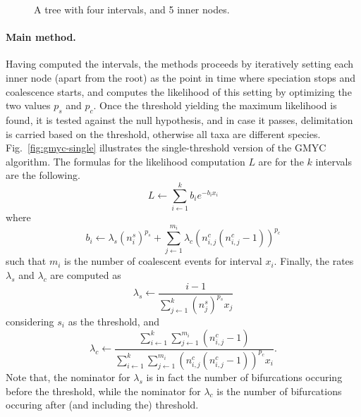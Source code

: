 \documentclass{llncs}
\begin{document}
\begin{figure}[t]
\centering

\caption{A tree with four intervals, and 5 inner nodes.}\label{fig:tree}
\end{figure}

\paragraph{\bf Main method.}
Having computed the intervals, the methods proceeds by iteratively setting each
inner node (apart from the root) as the point in time where speciation stops
and coalescence starts, and computes the likelihood of this setting by
optimizing the two values $p_s$ and $p_c$. Once the threshold yielding the
maximum likelihood is found, it is tested against the null hypothesis, and in
case it passes, delimitation is carried based on the threshold, otherwise all
taxa are different species. Fig.~\ref{fig:gmyc-single} illustrates the
single-threshold version of the GMYC algorithm.  The formulas for the
likelihood computation $L$ are for the $k$ intervals are the following.
$$L \leftarrow \sum_{i\leftarrow 1}^k b_i e^{-b_i x_i}$$
where
$$b_i \leftarrow \lambda_s (n_i^s)^{p_s} + \sum_{j\leftarrow 1}^{m_i}\lambda_c(n_{i,j}^c(n_{i,j}^c-1))^{p_c}$$
such that $m_i$ is the number of coalescent events for interval $x_i$. Finally, the rates $\lambda_s$ and $\lambda_c$
are computed as
$$ \lambda_s \leftarrow \frac{i-1}{\sum_{j\leftarrow 1}^k (n_j^s)^{p_s} x_j}$$
considering $s_i$ as the threshold, and
$$ \lambda_c \leftarrow \frac{\sum_{i\leftarrow 1}^k\sum_{j\leftarrow 1}^{m_i}(n_{i,j}^c-1)}{\sum_{i\leftarrow 1}^k\sum_{j\leftarrow 1}^{m_i}(n_{i,j}^c(n_{i,j}^c -1))^{p_c}x_i}.$$
Note that, the nominator for $\lambda_s$ is in fact the number of bifurcations
occuring before the threshold, while the nominator for $\lambda_c$ is the
number of bifurcations occuring after (and including the) threshold.
\end{document}
